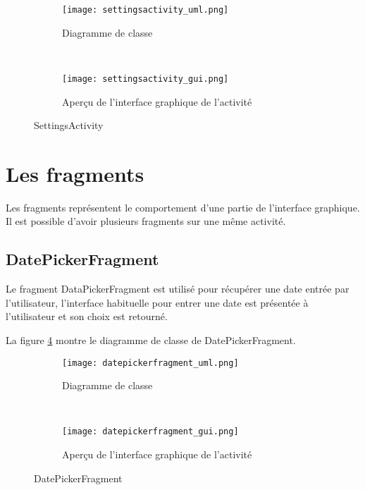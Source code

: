 \begin{figure}[htb!]
    \centering
    \begin{subfigure}[htb]{0.49\textwidth}
		\texttt{[image: settingsactivity\_uml.png]} 
		\caption{Diagramme de classe}
		\label{fig:settingsactivity_uml}
    \end{subfigure}
    ~ %
    \begin{subfigure}[htb]{0.49\textwidth}
		\texttt{[image: settingsactivity\_gui.png]} 
		\caption{Aperçu de l'interface graphique de l'activité}
		\label{fig:settingsactivity_gui}
    \end{subfigure}
    \caption{SettingsActivity}\label{fig:settingsactivity_fig}
\end{figure}

\section{Les fragments}

Les fragments représentent le comportement d'une partie de l'interface graphique. Il est possible d'avoir plusieurs fragments sur une même activité.

\subsection{DatePickerFragment}

Le fragment DataPickerFragment est utilisé pour récupérer une date entrée par l'utilisateur, l'interface habituelle pour entrer une date est présentée à l'utilisateur et son choix est retourné.

La figure \ref{fig:datepickerfragment_uml} montre le diagramme de classe de DatePickerFragment.

\begin{figure}[htb!]
    \centering
    \begin{subfigure}[htb]{0.49\textwidth}
		\texttt{[image: datepickerfragment\_uml.png]} 
		\caption{Diagramme de classe}
		\label{fig:datepickerfragment_uml}
    \end{subfigure}
    ~ %
    \begin{subfigure}[htb]{0.49\textwidth}
		\texttt{[image: datepickerfragment\_gui.png]} 
		\caption{Aperçu de l'interface graphique de l'activité}
		\label{fig:datepickerfragment_gui}
    \end{subfigure}
    \caption{DatePickerFragment}\label{fig:datepickerfragment_fig}
\end{figure}

